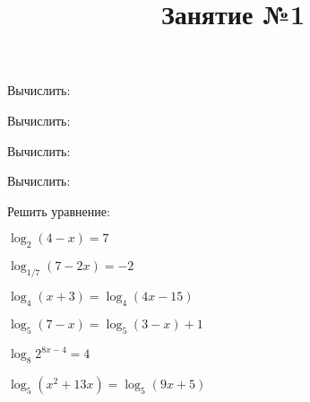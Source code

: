 \title{Занятие №1}
\begin{listofex}
	\item {}
	\item {}
	\item Вычислить:
	\begin{enumcols}[itemcolumns=3]
		\item {}
		\item {}
		\item {}
		\item {}
		\item {}
	\end{enumcols}
	\item Вычислить:
	\begin{enumcols}[itemcolumns=3]
		\item {}
		\item {}
		\item {}
	\end{enumcols}
	\item Вычислить:
	\begin{enumcols}[itemcolumns=3]
		\item {}
		\item {}
		\item {}
		\item {}
		\item {}
		\item {}
		\item {}
	\end{enumcols}
	\item Вычислить:
	\begin{enumcols}[itemcolumns=2]
		\item {}
		\item {}
		\item {}
		\item {}
	\end{enumcols}
	\item Решить уравнение:
	\begin{enumcols}[itemcolumns=2]
		\item \( \log_2(4-x)=7 \)
		\item \( \log_{1/7}(7-2x)=-2 \)
		\item \( \log_4(x+3)=\log_4(4x-15) \)
		\item \( \log_5(7-x)=\log_5(3-x)+1 \)
		\item \( \log_8 2^{8x-4}=4 \)
		\item \( \log_5(x^2+13x)=\log_5(9x+5) \)
	\end{enumcols}
\end{listofex}
